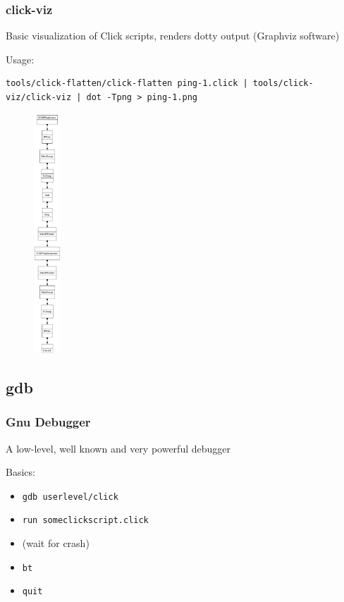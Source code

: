 \documentclass{beamer}
\begin{document}
\begin{frame}[fragile]
\frametitle{click-viz}
\begin{minipage}[t]{0.7\linewidth}

Basic visualization of Click scripts, renders dotty output (Graphviz software)

Usage:
\begin{lstlisting}
tools/click-flatten/click-flatten ping-1.click | tools/click-viz/click-viz | dot -Tpng > ping-1.png
\end{lstlisting}

\end{minipage}
\begin{minipage}[t]{0.15\linewidth}
\begin{figure}[t]
	\centering
	\includegraphics[width=1cm]{figures/clickvizcropped.pdf}
\end{figure}
\end{minipage}

\end{frame}

\subsection{gdb} %
\label{sub:gdb}

\begin{frame}
\frametitle{Gnu Debugger}
A low-level, well known and very powerful debugger

Basics:
\begin{itemize}
	\item \lstinline!gdb userlevel/click!
	\item \lstinline!run someclickscript.click!
	\item (wait for crash)
	\item \lstinline!bt!
	\item \lstinline!quit!
\end{itemize}
\end{frame}
\end{document}
